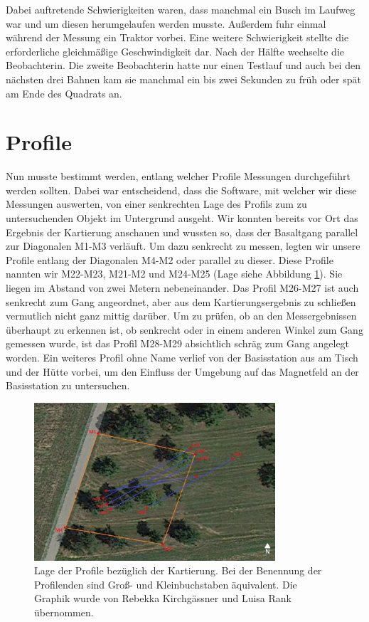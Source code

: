 Dabei auftretende Schwierigkeiten waren, dass manchmal ein Busch im Laufweg war und um diesen herumgelaufen werden musste. Außerdem fuhr einmal während der Messung ein Traktor vorbei. Eine weitere Schwierigkeit stellte die erforderliche gleichmäßige Geschwindigkeit dar. Nach der Hälfte wechselte die Beobachterin. Die zweite Beobachterin hatte nur einen Testlauf und auch bei den nächsten drei Bahnen kam sie manchmal ein bis zwei Sekunden zu früh oder spät am Ende des Quadrats an.

\section{Profile}

Nun musste bestimmt werden, entlang welcher Profile Messungen durchgeführt werden sollten. Dabei war entscheidend, dass die Software, mit welcher wir diese Messungen auswerten, von einer senkrechten Lage des Profils zum zu untersuchenden Objekt im Untergrund ausgeht.  Wir konnten bereits vor Ort das Ergebnis der Kartierung anschauen und wussten so, dass der Basaltgang parallel zur Diagonalen M1-M3 verläuft. Um dazu senkrecht zu messen, legten wir unsere Profile entlang der Diagonalen M4-M2 oder parallel zu dieser. Diese Profile nannten wir M22-M23, M21-M2 und M24-M25 (Lage siehe Abbildung \ref{fig:Profilegps}). Sie liegen im Abstand von zwei Metern nebeneinander. Das Profil M26-M27 ist auch senkrecht zum Gang angeordnet, aber aus dem Kartierungsergebnis zu schließen vermutlich nicht ganz mittig darüber. Um zu prüfen, ob an den Messergebnissen überhaupt zu erkennen ist, ob senkrecht oder in einem anderen Winkel zum Gang gemessen wurde, ist das Profil M28-M29 absichtlich schräg zum Gang angelegt worden. Ein weiteres Profil ohne Name verlief von der Basisstation aus am Tisch und der Hütte vorbei, um den Einfluss der Umgebung auf das Magnetfeld an der Basisstation zu untersuchen.

\begin{figure}[!ht]
 \centering
 \includegraphics[width=0.8\textwidth]{fig/Profilegps}
 \caption[Lage der Profile bezüglich der Kartierung]{Lage der Profile bezüglich der Kartierung. Bei der Benennung der Profilenden sind Groß- und Kleinbuchstaben äquivalent. Die Graphik wurde von Rebekka Kirchgässner und Luisa Rank übernommen.}
 \label{fig:Profilegps}
\end{figure}


